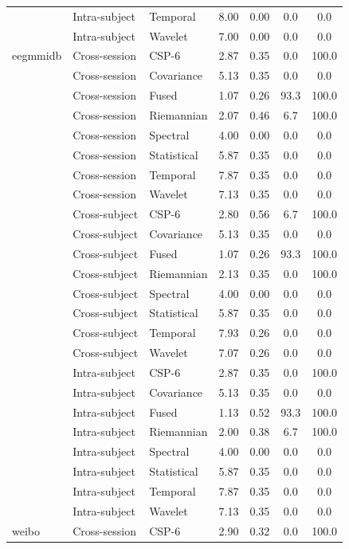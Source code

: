 \begin{table}[t]
\begin{tabular}{lllcccc}
 & Intra-subject & Temporal & 8.00 & 0.00 & 0.0 & 0.0 \\
 & Intra-subject & Wavelet & 7.00 & 0.00 & 0.0 & 0.0 \\
\midrule
eegmmidb & Cross-session & CSP-6 & 2.87 & 0.35 & 0.0 & 100.0 \\
 & Cross-session & Covariance & 5.13 & 0.35 & 0.0 & 0.0 \\
 & Cross-session & Fused & 1.07 & 0.26 & 93.3 & 100.0 \\
 & Cross-session & Riemannian & 2.07 & 0.46 & 6.7 & 100.0 \\
 & Cross-session & Spectral & 4.00 & 0.00 & 0.0 & 0.0 \\
 & Cross-session & Statistical & 5.87 & 0.35 & 0.0 & 0.0 \\
 & Cross-session & Temporal & 7.87 & 0.35 & 0.0 & 0.0 \\
 & Cross-session & Wavelet & 7.13 & 0.35 & 0.0 & 0.0 \\
 & Cross-subject & CSP-6 & 2.80 & 0.56 & 6.7 & 100.0 \\
 & Cross-subject & Covariance & 5.13 & 0.35 & 0.0 & 0.0 \\
 & Cross-subject & Fused & 1.07 & 0.26 & 93.3 & 100.0 \\
 & Cross-subject & Riemannian & 2.13 & 0.35 & 0.0 & 100.0 \\
 & Cross-subject & Spectral & 4.00 & 0.00 & 0.0 & 0.0 \\
 & Cross-subject & Statistical & 5.87 & 0.35 & 0.0 & 0.0 \\
 & Cross-subject & Temporal & 7.93 & 0.26 & 0.0 & 0.0 \\
 & Cross-subject & Wavelet & 7.07 & 0.26 & 0.0 & 0.0 \\
 & Intra-subject & CSP-6 & 2.87 & 0.35 & 0.0 & 100.0 \\
 & Intra-subject & Covariance & 5.13 & 0.35 & 0.0 & 0.0 \\
 & Intra-subject & Fused & 1.13 & 0.52 & 93.3 & 100.0 \\
 & Intra-subject & Riemannian & 2.00 & 0.38 & 6.7 & 100.0 \\
 & Intra-subject & Spectral & 4.00 & 0.00 & 0.0 & 0.0 \\
 & Intra-subject & Statistical & 5.87 & 0.35 & 0.0 & 0.0 \\
 & Intra-subject & Temporal & 7.87 & 0.35 & 0.0 & 0.0 \\
 & Intra-subject & Wavelet & 7.13 & 0.35 & 0.0 & 0.0 \\
\midrule
weibo & Cross-session & CSP-6 & 2.90 & 0.32 & 0.0 & 100.0 \\

\end{tabular}
\end{table}
